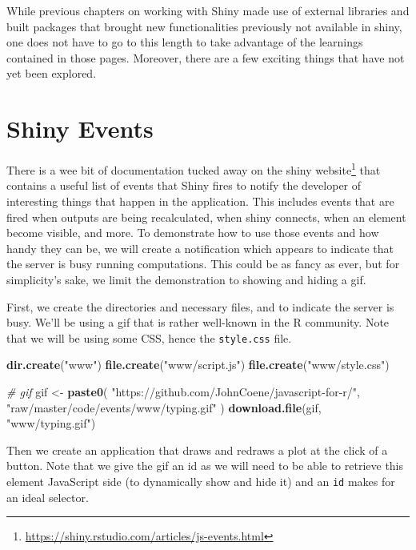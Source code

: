 \documentclass[10pt,]{krantz}
\makeatletter
\newenvironment{Shaded}{\begin{snugshade}}{\end{snugshade}}
\newcommand{\CommentTok}[1]{\textcolor[rgb]{0.37,0.37,0.37}{\textit{#1}}}
\newcommand{\KeywordTok}[1]{\textcolor[rgb]{0.27,0.27,0.27}{\textbf{#1}}}
\newcommand{\NormalTok}[1]{#1}
\newcommand{\StringTok}[1]{\textcolor[rgb]{0.5,0.5,0.5}{#1}}
\renewcommand{\href}[2]{#2\footnote{\url{#1}}}
\newenvironment{kframe}{%
\medskip{}
\setlength{\fboxsep}{.8em}
 \def\at@end@of@kframe{}%
 \ifinner\ifhmode%
  \def\at@end@of@kframe{\end{minipage}}%
  \begin{minipage}{\columnwidth}%
 \fi\fi%
 \def\FrameCommand##1{\hskip\@totalleftmargin \hskip-\fboxsep
 \colorbox{shadecolor}{##1}\hskip-\fboxsep
     \hskip-\linewidth \hskip-\@totalleftmargin \hskip\columnwidth}%
 \MakeFramed {\advance\hsize-\width
   \@totalleftmargin\z@ \linewidth\hsize
   \@setminipage}}%
 {\par\unskip\endMakeFramed%
 \at@end@of@kframe}
\renewenvironment{Shaded}{\begin{kframe}}{\end{kframe}}
\makeatother
\begin{document}
While previous chapters on working with Shiny made use of external libraries and built packages that brought new functionalities previously not available in shiny, one does not have to go to this length to take advantage of the learnings contained in those pages. Moreover, there are a few exciting things that have not yet been explored.

\hypertarget{shiny-tips-events}{%
\section{Shiny Events}\label{shiny-tips-events}}

There is a wee bit of documentation tucked away on the \href{https://shiny.rstudio.com/articles/js-events.html}{shiny website} that contains a useful list of events that Shiny fires to notify the developer of interesting things that happen in the application. This includes events that are fired when outputs are being recalculated, when shiny connects, when an element become visible, and more. To demonstrate how to use those events and how handy they can be, we will create a notification which appears to indicate that the server is busy running computations. This could be as fancy as ever, but for simplicity's sake, we limit the demonstration to showing and hiding a gif.

First, we create the directories and necessary files, and to indicate the server is busy. We'll be using a gif that is rather well-known in the R community. Note that we will be using some CSS, hence the \texttt{style.css} file.

\begin{Shaded}
\begin{Highlighting}[]
\KeywordTok{dir.create}\NormalTok{(}\StringTok{"www"}\NormalTok{)}
\KeywordTok{file.create}\NormalTok{(}\StringTok{"www/script.js"}\NormalTok{)}
\KeywordTok{file.create}\NormalTok{(}\StringTok{"www/style.css"}\NormalTok{)}

\CommentTok{# gif}
\NormalTok{gif <-}\StringTok{ }\KeywordTok{paste0}\NormalTok{(}
  \StringTok{"https://github.com/JohnCoene/javascript-for-r/"}\NormalTok{,}
  \StringTok{"raw/master/code/events/www/typing.gif"}
\NormalTok{)}
\KeywordTok{download.file}\NormalTok{(gif, }\StringTok{"www/typing.gif"}\NormalTok{)}
\end{Highlighting}
\end{Shaded}

Then we create an application that draws and redraws a plot at the click of a button. Note that we give the gif an id as we will need to be able to retrieve this element JavaScript side (to dynamically show and hide it) and an \texttt{id} makes for an ideal selector.
\end{document}
